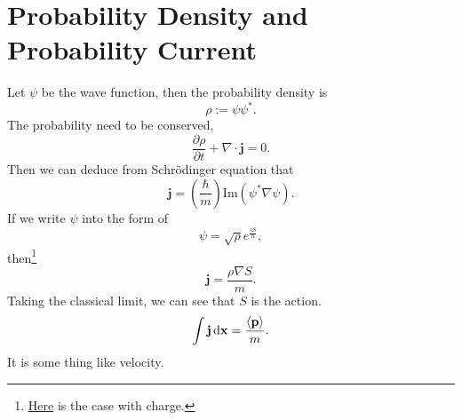 \documentclass{article}
\theoremstyle{1}
\newcommand{\pa}{\partial}
\begin{document}
\section{Probability Density and Probability Current}
Let $\psi $ be  the wave function, then the probability density is
\begin{equation}
    \rho:=\psi\psi^*.
\end{equation}
The probability need to be conserved,
\begin{equation}
    \frac{\pa \rho}{\pa t}+\nabla \cdot\mathbf{j}=0.
\end{equation}
Then we can deduce from Schrödinger equation that 
\begin{equation}
    \mathbf{j}=\left(\frac{\hbar}{m}\right)\mathrm{Im}(\psi^*\nabla\psi).
\end{equation}
If we write $\psi$ into the form of 
\begin{equation}
    \psi=\sqrt{\rho}e^{\frac{iS}{\hbar}},
\end{equation}
then\footnote{\hyperref[charged case]{Here} is the case with charge.} 
\begin{equation}
    \mathbf{j}=\frac{\rho\nabla S}{m}.
\end{equation}
Taking the classical limit, we can see that $S$ is the action.
\begin{equation}
    \int\mathbf{j}\dd{\mathbf{x}}=\frac{\expval{\mathbf{p}}}{m}.
\end{equation}
It is some thing like velocity.
\end{document}
